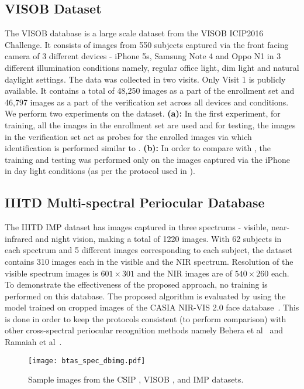 \documentclass[10pt,twocolumn,letterpaper]{article}
\begin{document}
\subsection{VISOB Dataset}
\label{visob}
  \vspace{-4pt}
The VISOB database \cite{VISOB_Dataset} is a large scale dataset from the VISOB ICIP2016 Challenge. It consists of images from 550 subjects captured via the front facing camera of 3 different devices - iPhone 5s, Samsung Note 4 and Oppo N1 in 3 different illumination conditions namely, regular office light, dim light and natural daylight settings. The data was collected in two visits. Only Visit 1 is publicly available. It contains a total of 48,250 images as a part of the enrollment set and 46,797 images as a part of the verification set across all devices and conditions. We perform two experiments on the dataset. \textbf{(a):} In the first experiment, for training, all the images in the enrollment set are used and for testing, the images in the verification set act as probes for the enrolled images via which identification is performed similar to \cite{ahuja2017convolutional}. \textbf{(b):} In order to compare with \cite{zhao2018improving}, the training and testing was performed only on the images captured via the iPhone in day light conditions (as per the protocol used in \cite{zhao2018improving}). 

\subsection{IIITD Multi-spectral Periocular Database}
  \vspace{-4pt}
The IIITD IMP dataset \cite{sharma2014cross} has images captured in three spectrums - visible, near-infrared and night vision, making a total of 1220 images. With 62 subjects in each spectrum and 5 different images corresponding to each subject, the dataset contains 310 images each in the visible and the NIR spectrum. Resolution of the visible spectrum images is $601 \times 301$ and the NIR images are of $540 \times 260$ each. To demonstrate the effectiveness of the proposed approach, no training is performed on this database. The proposed algorithm is evaluated by using the model trained on cropped images of the CASIA NIR-VIS 2.0 face database~\cite{li2013casia}. This is done in order to keep the protocols consistent (to perform comparison) with other cross-spectral periocular recognition methods namely Behera et al~\cite{behera2017periocular} and Ramaiah et al~\cite{ramaiah2016matching}. 
\begin{figure}
  \centering
  \texttt{[image: btas\_spec\_dbimg.pdf]}
    \vspace{-8pt}
  \caption{Sample images from the CSIP \cite{santos2015fusing}, VISOB \cite{VISOB_Dataset}, and IMP \cite{sharma2014cross} datasets.}
    \vspace{-12pt}
  \label{fig:eg_imgs}
 \end{figure} 
 \vspace{-8pt}
\end{document}
